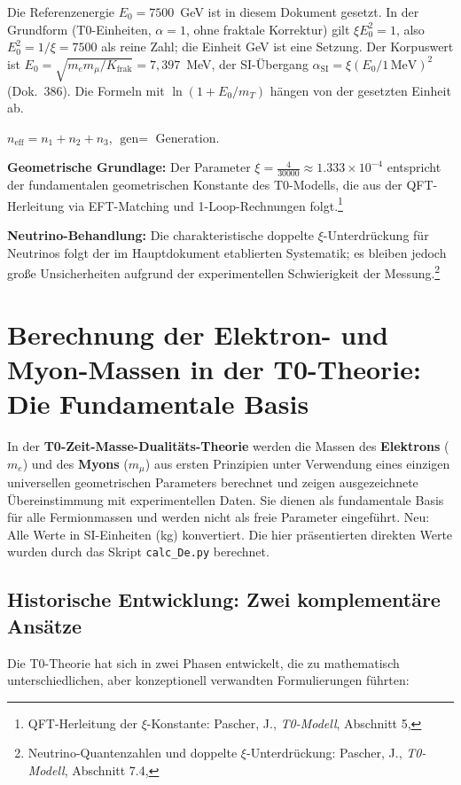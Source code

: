 	Die Referenzenergie $E_0 = 7500$~GeV ist in diesem Dokument gesetzt. In der Grundform (T0-Einheiten, $\alpha = 1$, ohne fraktale Korrektur) gilt $\xi E_0^2 = 1$, also $E_0^2 = 1/\xi = 7500$ als reine Zahl; die Einheit GeV ist eine Setzung. Der Korpuswert ist $E_0 = \sqrt{m_e m_\mu/K_{\text{frak}}} = 7{,}397$~MeV, der SI-Übergang $\alpha_{\text{SI}} = \xi (E_0/1\,\text{MeV})^2$ (Dok.~386). Die Formeln mit $\ln(1 + E_0/m_T)$ hängen von der gesetzten Einheit ab.
	
	$n_{\text{eff}} = n_1 + n_2 + n_3$, $\text{gen} =$ Generation.
	
	\textbf{Geometrische Grundlage:} Der Parameter $\xi = \frac{4}{30000} \approx 1.333 \times 10^{-4}$ entspricht der fundamentalen geometrischen Konstante des T0-Modells, die aus der QFT-Herleitung via EFT-Matching und 1-Loop-Rechnungen folgt.\footnote{QFT-Herleitung der $\xi$-Konstante: Pascher, J., \emph{T0-Modell}, Abschnitt 5, }
	
	\textbf{Neutrino-Behandlung:} Die charakteristische doppelte $\xi$-Unterdrückung für Neutrinos folgt der im Hauptdokument etablierten Systematik; es bleiben jedoch große Unsicherheiten aufgrund der experimentellen Schwierigkeit der Messung.\footnote{Neutrino-Quantenzahlen und doppelte $\xi$-Unterdrückung: Pascher, J., \emph{T0-Modell}, Abschnitt 7.4, }
	
	\section{Berechnung der Elektron- und Myon-Massen in der T0-Theorie: Die Fundamentale Basis}
	
	In der \textbf{T0-Zeit-Masse-Dualitäts-Theorie} werden die Massen des \textbf{Elektrons} ($m_e$) und des \textbf{Myons} ($m_\mu$) aus ersten Prinzipien unter Verwendung eines einzigen universellen geometrischen Parameters berechnet und zeigen ausgezeichnete Übereinstimmung mit experimentellen Daten. Sie dienen als fundamentale Basis für alle Fermionmassen und werden nicht als freie Parameter eingeführt. Neu: Alle Werte in SI-Einheiten (kg) konvertiert. Die hier präsentierten direkten Werte wurden durch das Skript \texttt{calc\_De.py} berechnet.
	
	\subsection{Historische Entwicklung: Zwei komplementäre Ansätze}
	
	Die T0-Theorie hat sich in zwei Phasen entwickelt, die zu mathematisch unterschiedlichen, aber konzeptionell verwandten Formulierungen führten:
	
